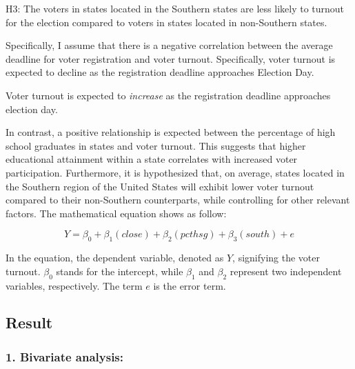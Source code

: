 \documentclass[
  letterpaper,
  DIV=11,
  numbers=noendperiod]{scrartcl}
\begin{document}
H3: The voters in states located in the Southern states are less likely
to turnout for the election compared to voters in states located in
non-Southern states.

Specifically, I assume that there is a negative correlation between the
average deadline for voter registration and voter turnout. Specifically,
voter turnout is expected to decline as the registration deadline
approaches Election Day.

\begin{tcolorbox}[enhanced jigsaw, titlerule=0mm, colframe=quarto-callout-note-color-frame, rightrule=.15mm, coltitle=black, leftrule=.75mm, breakable, colback=white, toprule=.15mm, left=2mm, bottomrule=.15mm, colbacktitle=quarto-callout-note-color!10!white, opacityback=0, arc=.35mm, bottomtitle=1mm, opacitybacktitle=0.6, title=\textcolor{quarto-callout-note-color}{\faInfo}\hspace{0.5em}{Note}, toptitle=1mm]

Voter turnout is expected to \emph{increase} as the registration
deadline approaches election day.

\end{tcolorbox}

In contrast, a positive relationship is expected between the percentage
of high school graduates in states and voter turnout. This suggests that
higher educational attainment within a state correlates with increased
voter participation. Furthermore, it is hypothesized that, on average,
states located in the Southern region of the United States will exhibit
lower voter turnout compared to their non-Southern counterparts, while
controlling for other relevant factors. The mathematical equation shows
as follow:

\[Y = \beta_0+\beta_1(close)+\beta_2(pcthsg)+\beta_3(south)+e\]

In the equation, the dependent variable, denoted as \(Y\), signifying
the voter turnout. \(\beta_0\) stands for the intercept, while
\(\beta_1\) and \(\beta_2\) represent two independent variables,
respectively. The term \(e\) is the error term.

\hypertarget{result}{%
\subsection{Result}\label{result}}

\hypertarget{bivariate-analysis}{%
\subsubsection{\texorpdfstring{\textbf{1. Bivariate
analysis:}}{1. Bivariate analysis:}}\label{bivariate-analysis}}
\end{document}

